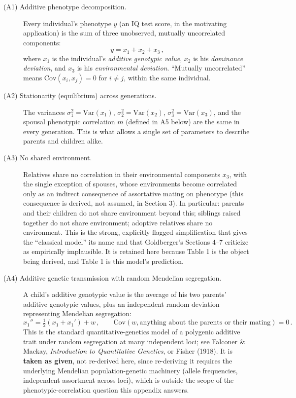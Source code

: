 \documentclass[12pt]{article}
\begin{document}
\begin{description}
\item[(A1) Additive phenotype decomposition.] Every individual's phenotype $y$ (an IQ test score, in the motivating application) is the sum of three unobserved, mutually uncorrelated components:
\begin{equation*}
y = x_1 + x_2 + x_3 \, ,
\end{equation*}
where $x_1$ is the individual's \emph{additive genotypic value}, $x_2$ is his \emph{dominance deviation}, and $x_3$ is his \emph{environmental deviation}. ``Mutually uncorrelated'' means $\mathrm{Cov}(x_i,x_j)=0$ for $i\ne j$, within the same individual.

\item[(A2) Stationarity (equilibrium) across generations.] The variances $\sigma_1^2=\mathrm{Var}(x_1)$, $\sigma_2^2=\mathrm{Var}(x_2)$, $\sigma_3^2=\mathrm{Var}(x_3)$, and the spousal phenotypic correlation $m$ (defined in A5 below) are the same in every generation. This is what allows a single set of parameters to describe parents and children alike.

\item[(A3) No shared environment.] Relatives share no correlation in their environmental components $x_3$, with the single exception of spouses, whose environments become correlated only as an indirect consequence of assortative mating on phenotype (this consequence is derived, not assumed, in Section 3). In particular: parents and their children do not share environment beyond this; siblings raised together do not share environment; adoptive relatives share no environment. This is the strong, explicitly flagged simplification that gives the ``classical model'' its name and that Goldberger's Sections 4--7 criticize as empirically implausible. It is retained here because Table 1 is the object being derived, and Table 1 is this model's prediction.

\item[(A4) Additive genetic transmission with random Mendelian segregation.] A child's additive genotypic value is the average of his two parents' additive genotypic values, plus an independent random deviation representing Mendelian segregation:
\begin{equation*}
x_1'' = \tfrac{1}{2}(x_1+x_1') + w \, , \qquad \mathrm{Cov}(w,\text{anything about the parents or their mating}) = 0 \, .
\end{equation*}
This is the standard quantitative-genetics model of a polygenic additive trait under random segregation at many independent loci; see Falconer \& Mackay, \emph{Introduction to Quantitative Genetics}, or Fisher (1918). It is \textbf{taken as given}, not re-derived here, since re-deriving it requires the underlying Mendelian population-genetic machinery (allele frequencies, independent assortment across loci), which is outside the scope of the phenotypic-correlation question this appendix answers.


\end{description}
\end{document}
